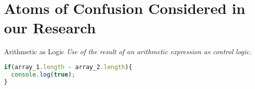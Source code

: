 \section{Atoms of Confusion Considered in our Research}\label{sec:appendix-atoms} 

\begin{atom}{Arithmetic as Logic}
\emph{Use of the result of an arithmetic expression as control logic.}

\begin{lstlisting}[language=JavaScript]
if(array_1.length - array_2.length){
  console.log(true);
}
\end{lstlisting}
\end{atom}


